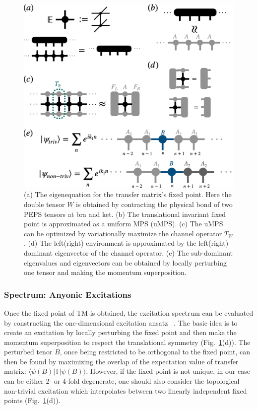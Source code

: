 \documentclass{ntuthesis}
\newcommand{\citep}{\cite}
\begin{document}
\begin{figure}[h]
 \centering
\includegraphics[width=0.8\linewidth]{vumps_excitation}
\caption{(a) The eigenequation for the transfer matrix's fixed point. Here the double tensor $W$ is obtained by contracting the physical bond of two PEPS tensors at bra and ket. (b) The translational invariant fixed point is approximated as a uniform MPS (uMPS). (c) The uMPS can be optimized by variationally maximize the channel operator $T_W$. (d) The left(right) environment is approximated by the left(right) dominant eigenvector of the channel operator. (e) The sub-dominant eigenvalues and eigenvectors can be obtained by locally perturbing one tensor and making the momentum superposition.} 
\label{fig:vumps_excitation}
\end{figure}

\subsubsection{Spectrum: Anyonic Excitations}
\label{subsubsec:tm-spectrum}
Once the fixed point of TM is obtained, the excitation spectrum can be evaluated by constructing the one-dimensional excitation ansatz ~\citep{2012_excitation}. The basic idea is to create an excitation by locally perturbing the fixed point and then make the momentum superposition to respect the translational symmetry (Fig.~\ref{fig:vumps_excitation}(d)). The perturbed tenor $B$, once being restricted to be orthogonal to the fixed point, can then be found by maximizing the overlap of the expectation value of transfer matrix: $\langle \psi(B)|\mathbb{T}|\psi(B)\rangle$. However, if the fixed point is not unique, in our case can be either 2- or 4-fold degenerate, one should also consider the topological non-trivial excitation which interpolates between two linearly independent fixed points (Fig.~\ref{fig:vumps_excitation}(d)). 
\end{document}

